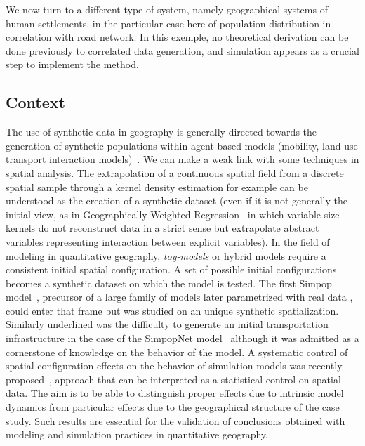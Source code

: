 \documentclass{article}
\begin{document}
We now turn to a different type of system, namely geographical systems of human settlements, in the particular case here of population distribution in correlation with road network. In this exemple, no theoretical derivation can be done previously to correlated data generation, and simulation appears as a crucial step to implement the method.
 

\subsection*{Context}


The use of synthetic data in geography is generally directed towards the generation of synthetic populations within agent-based models (mobility, land-use transport interaction models)~\cite{pritchard2009advances}. We can make a weak link with some techniques in spatial analysis. The extrapolation of a continuous spatial field from a discrete spatial sample through a kernel density estimation for example can be understood as the creation of a synthetic dataset (even if it is not generally the initial view, as in Geographically Weighted Regression~\cite{brunsdon1998geographically} in which variable size kernels do not reconstruct data in a strict sense but extrapolate abstract variables representing interaction between explicit variables). In the field of modeling in quantitative geography, \emph{toy-models} or hybrid models require a consistent initial spatial configuration. A set of possible initial configurations becomes a synthetic dataset on which the model is tested. The first Simpop model~\cite{sanders1997simpop}, precursor of a large family of models later parametrized with real data \cite{pumain2012multi}, could enter that frame but was studied on an unique synthetic spatialization. Similarly underlined was the difficulty to generate an initial transportation infrastructure in the case of the SimpopNet model~\cite{schmitt2014modelisation} although it was admitted as a cornerstone of knowledge on the behavior of the model. A systematic control of spatial configuration effects on the behavior of simulation models was recently proposed~\cite{raimbault2018space}, approach that can be interpreted as a statistical control on spatial data. The aim is to be able to distinguish proper effects due to intrinsic model dynamics from particular effects due to the geographical structure of the case study. Such results are essential for the validation of conclusions obtained with modeling and simulation practices in quantitative geography.
\end{document}
